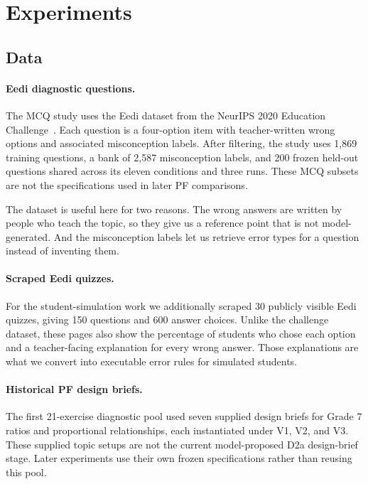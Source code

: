 \section{Experiments}

\subsection{Data}

\paragraph{Eedi diagnostic questions.} The MCQ study uses the Eedi dataset from the NeurIPS 2020 Education Challenge~\cite{wang2021eedi}. Each question is a four-option item with teacher-written wrong options and associated misconception labels. After filtering, the study uses 1{,}869 training questions, a bank of 2{,}587 misconception labels, and 200 frozen held-out questions shared across its eleven conditions and three runs. These MCQ subsets are not the specifications used in later PF comparisons.

The dataset is useful here for two reasons. The wrong answers are written by people who teach the topic, so they give us a reference point that is not model-generated. And the misconception labels let us retrieve error types for a question instead of inventing them.

\paragraph{Scraped Eedi quizzes.} For the student-simulation work we additionally scraped 30 publicly visible Eedi quizzes, giving 150 questions and 600 answer choices. Unlike the challenge dataset, these pages also show the percentage of students who chose each option and a teacher-facing explanation for every wrong answer. Those explanations are what we convert into executable error rules for simulated students.

\paragraph{Historical PF design briefs.} The first 21-exercise diagnostic pool used seven supplied design briefs for Grade 7 ratios and proportional relationships, each instantiated under V1, V2, and V3. These supplied topic setups are not the current model-proposed D2a design-brief stage. Later experiments use their own frozen specifications rather than reusing this pool.

